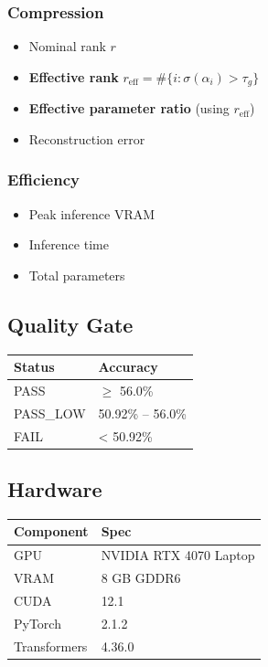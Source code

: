 \subsubsection{Compression}
\begin{itemize}
\item Nominal rank $r$
\item \textbf{Effective rank} $r_\text{eff} = \#\{i : \sigma(\alpha_i) > \tau_g\}$
\item \textbf{Effective parameter ratio} (using $r_\text{eff}$)
\item Reconstruction error

\end{itemize}
\subsubsection{Efficiency}
\begin{itemize}
\item Peak inference VRAM
\item Inference time
\item Total parameters

\end{itemize}
\subsection{Quality Gate}

\begin{table}[H]
\centering
\small
\begin{tabular}{ll}
\toprule
\textbf{Status} & \textbf{Accuracy} \\
\midrule
PASS & $\ge$ 56.0\% \\
PASS\_LOW & 50.92\% -- 56.0\% \\
FAIL & \textless{} 50.92\% \\
\bottomrule
\end{tabular}
\end{table}

\subsection{Hardware}

\begin{table}[H]
\centering
\small
\begin{tabular}{ll}
\toprule
\textbf{Component} & \textbf{Spec} \\
\midrule
GPU & NVIDIA RTX 4070 Laptop \\
VRAM & 8 GB GDDR6 \\
CUDA & 12.1 \\
PyTorch & 2.1.2 \\
Transformers & 4.36.0 \\
\bottomrule
\end{tabular}
\end{table}


